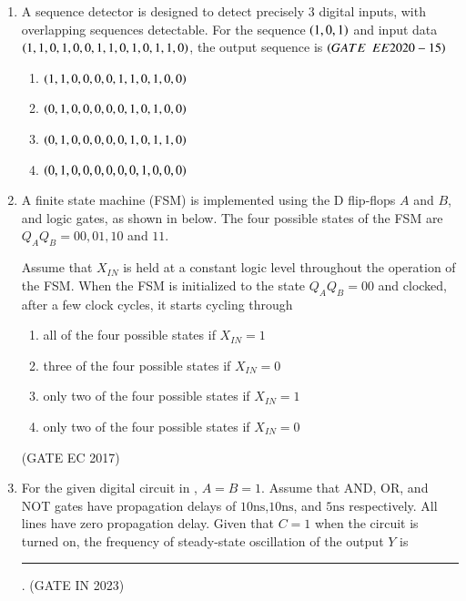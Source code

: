 \begin{enumerate}[label=\arabic*.,ref=\theenumi]
\begin{enumerate}
\end{enumerate}

\item A sequence detector is designed to detect precisely $3$ digital inputs, with overlapping sequences detectable. For the sequence $\left(1,0,1\right)$ and input data $\left(1,1,0,1,0,0,1,1,0,1,0,1,1,0\right)$, the output sequence is
$\hfill\brak{GATE\enspace EE2020-15}$
   \begin{enumerate}
  \item  $\left(1,1,0,0,0,0,1,1,0,1,0,0\right)$
  \item $\left(0,1,0,0,0,0,0,1,0,1,0,0\right)$
  \item $\left(0,1,0,0,0,0,0,1,0,1,1,0\right)$
  \item $\left(0,1,0,0,0,0,0,0,1,0,0,0\right)$

\end{enumerate}

\item A finite state machine (FSM) is implemented using the D flip-flops $A$ and $B$, and logic gates, as shown in  
	below. The four possible states of the FSM are $Q_AQ_B = 00, 01, 10$ and	 $11$.  
%
\begin{figure}[H]
\centering
\resizebox{0.75\columnwidth}{!}{%
	
}%
	\caption{}
\label{fig:ide/fsm/figs/circuit}
\end{figure}
Assume that $X_{IN}$ is held at a constant logic level throughout the operation of the FSM. When the FSM is initialized to the state $Q_AQ_B = 00$ and clocked, after a few clock cycles, it starts cycling through
\begin{enumerate}
\item all of the four possible states if $X_{IN} = 1$
\item three of the four possible states if $X_{IN} = 0$
\item only two of the four possible states if $X_{IN} = 1$
\item only two of the four possible states if $X_{IN} = 0$
\end{enumerate}
\hfill{(GATE EC 2017)}
\item For the given digital circuit
in	,
	 $A = B = 1$. Assume that AND, OR, and NOT gates have propagation delays of $10\mathrm{ns}$,$10\mathrm{ns}$, and $5\mathrm{ns}$ respectively. All lines have zero
propagation delay. Given that $C = 1$ when the circuit is turned on, the frequency of steady-state oscillation of the output $Y$  is  \rule{1cm}{0.5pt}.
\hfill (GATE IN 2023)
\begin{figure}[H]
        \centering  
        

\end{figure}
\end{enumerate}
